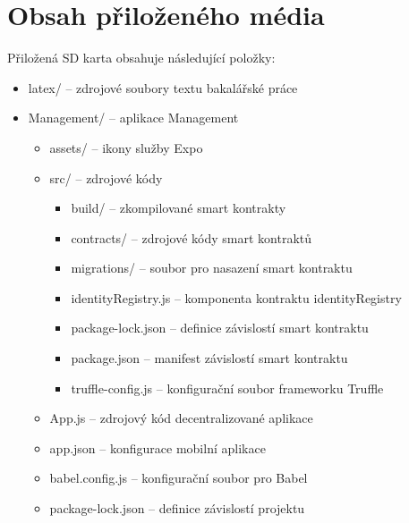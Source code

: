 
%


\chapter{Obsah přiloženého média}
Přiložená SD karta obsahuje následující položky:
\begin{itemize}
 \item latex/ -- zdrojové soubory textu bakalářské práce
 \item Management/ -- aplikace Management
    \begin{itemize}
        \item assets/ -- ikony služby Expo 
        \item src/ -- zdrojové kódy 
        \begin{itemize}
            \item build/ -- zkompilované smart kontrakty 
            \item contracts/ -- zdrojové kódy smart kontraktů
            \item migrations/ -- soubor pro nasazení smart kontraktu
            \item identityRegistry.js -- komponenta kontraktu identityRegistry
            \item package-lock.json -- definice závislostí smart kontraktu
            \item package.json -- manifest závislostí smart kontraktu
            \item truffle-config.js -- konfigurační soubor frameworku Truffle
        \end{itemize}
        \item App.js -- zdrojový kód decentralizované aplikace
        \item app.json -- konfigurace mobilní aplikace
        \item babel.config.js -- konfigurační soubor pro Babel
        \item package-lock.json -- definice závislostí projektu

\end{itemize}
\end{itemize}
